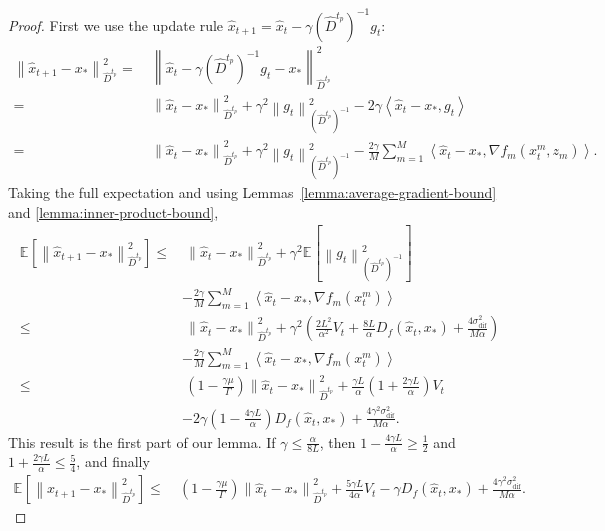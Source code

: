 \documentclass[sn-mathphys,Numbered]{sn-jnl}%
\renewcommand{\|}{\parallel}
\newcommand\ec[2][]{\ensuremath{\mathbb{E}_{#1} \left[#2\right]}}
\newcommand\ecn[3][]{\ec[#1]{\norm{#2}^2_{#3}}}
\newcommand\ev[1]{\left \langle #1 \right \rangle}
\newcommand\br[1]{\left ( #1 \right )}
\newcommand{\norm}[1]{\left\lVert#1\right\rVert}
\newcommand{\sqn}[1]{{\left\lVert#1\right\rVert}^2}
\newcommand{\sigmaf}{\sigma_{\mathrm{dif}}}
\renewcommand {\*} {\ast}
\begin{document}
\begin{proof}
    First we use the update rule $\hat{x}_{t+1} = \hat{x}_t - \gamma (\hat{D}^{t_p})^{-1}g_t$:
    \begin{align*}
        \sqn{\hat{x}_{t+1} - x_\ast}_{\hat{D}^{t_p}} =&\ \sqn{\hat{x}_t - \gamma (\hat{D}^{t_p})^{-1}g_t - x_\ast}_{\hat{D}^{t_p}} \\
        =&\ \sqn{\hat{x}_t - x_\ast}_{\hat{D}^{t_p}} + \gamma^2 \sqn{g_t}_{(\hat{D}^{t_p})^{-1}} - 2 \gamma \ev{\hat{x}_t - x_\ast, g_t} \\
        =&\ \sqn{\hat{x}_t - x_\ast}_{\hat{D}^{t_p}} + \gamma^2 \sqn{g_t}_{(\hat{D}^{t_p})^{-1}} - \frac{2 \gamma}{M} \sum_{m=1}^{M} \ev{\hat{x}_t - x_\ast, \nabla  f_m(x_t^m, z_m)}.
    \end{align*}
    Taking the full expectation and using Lemmas~\ref{lemma:average-gradient-bound} and \ref{lemma:inner-product-bound},
    \begin{align*}
        \ecn{\hat{x}_{t+1} - x_\ast}{\hat{D}^{t_p}}\leq&\ \sqn{\hat{x}_{t} - x_\ast}_{\hat{D}^{t_p}} + \gamma^2 \ecn{g_t}{(\hat{D}^{t_p})^{-1}} \\ &- \frac{2 \gamma}{M} \sum_{m=1}^{M} \ev{\hat{x}_t - x_\ast, \nabla f_m (x_t^m)} \\
        \leq&\ \sqn{\hat{x}_{t} - x_\ast}_{\hat{D}^{t_p}} + \gamma^2 \br{ \frac{2L^2}{\alpha^2} V_t + \frac{8L}{\alpha} D_{f} (\hat{x}_t, x_\ast) + \frac{4 \sigmaf^2}{M\alpha}} \\ &- \frac{2 \gamma}{M} \sum_{m=1}^{M} \ev{\hat{x}_t - x_\ast, \nabla f_m (x_t^m)}  \\
        \leq&\ \br{1 - \frac{\gamma \mu}{\Gamma}} \sqn{\hat{x}_{t} - x_\ast}_{\hat{D}^{t_p}} + \frac{\gamma L}{\alpha} \br{1 + \frac{2\gamma L}{\alpha}} V_t \\ &- 2 \gamma \br{1 - \frac{4\gamma L}{\alpha}} D_{f} (\hat{x}_t, x_\ast) + \frac{4 \gamma^2 \sigmaf^2}{M\alpha}.
    \end{align*}
    This result is the first part of our lemma.
    If $\gamma \leq \frac{\alpha}{8L}$, then $1 - \frac{4 \gamma L}{\alpha} \geq \frac{1}{2}$ and $1 + \frac{2 \gamma L}{\alpha} \leq \frac{5}{4}$, and finally
    \begin{align*}
        \ecn{\hat{x}_{t+1} - x_\ast}{\hat{D}^{t_p}} \leq&\ \br{1 - \frac{\gamma \mu}{\Gamma}} \sqn{\hat{x}_{t} - x_\ast}_{\hat{D}^{t_p}} + \frac{5\gamma L}{4\alpha} V_t - \gamma D_{f} (\hat{x}_t, x_\ast) + \frac{4 \gamma^2 \sigmaf^2}{M\alpha}.
    \end{align*}
\end{proof}
\end{document}
